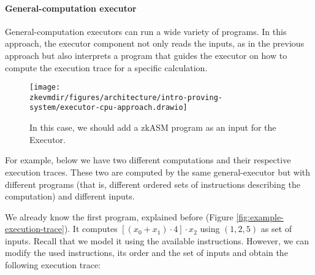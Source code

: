 \paragraph*{General-computation executor}

General-computation executors can run a wide variety of programs. In this approach, the executor component not only reads the inputs, as in the previous approach but also interprets a program that guides the executor on how to compute the execution trace for a specific calculation.

\begin{figure}[H]
\centering
\texttt{[image: \\zkevmdir/figures/architecture/intro-proving-system/executor-cpu-approach.drawio]}
\caption{In this case, we should add a zkASM program as an input for the Executor.}
\label{fig:general-computation-executor}
\end{figure}


For example, below we have two different computations and their respective execution traces. These two are computed by the same general-executor but with different programs (that is, different ordered sets of instructions describing the computation) and different inputs.

We already know the first program, explained before (Figure \ref{fig:example-execution-trace}). It computes $[(x_0+x_1)\cdot4]\cdot x_2$ using $(1, 2, 5)$ as set of inputs. Recall that we model it using the available instructions. However, we can modify the used instructions, its order and the set of inputs and obtain the following execution trace:


